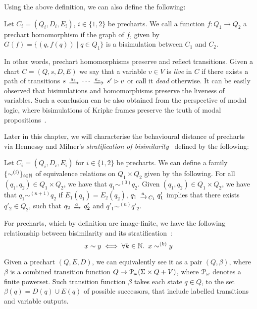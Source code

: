 Using the above definition, we can also define the following:
\begin{definition}
	 Let $C_i = (Q_i,D_i,E_i)$, $i \in \{1,2\}$ be precharts. We call a function $f \colon Q_1 \to Q_2$ a prechart homomorphism if the graph of $f$, given by $G(f) = \{(q,f(q)) \mid q \in Q_1\}$ is a bisimulation between $C_1$ and $C_2$.
\end{definition}
In other words, prechart homomorphisms preserve and reflect transitions. Given a chart $C=(Q,s,D,E)$ we say that a variable $v \in V$ is \emph{live} in $C$ if there exists a path of transitions $s \tr{a_1} \dots \tr{a_n} s' \rhd v$ or call it \emph{dead} otherwise. It can be easily observed that bisimulations and homomorphisms preserve the liveness of variables. Such a conclusion can be also obtained from the perspective of modal logic, where bisimulations of Kripke frames preserve the truth of modal propositions~\cite[Chapter~2]{Blackburn:2001:Modal}.

Later in this chapter, we will characterise the behavioural distance of precharts via Hennessy and Milner's \emph{stratification of bisimilarity}~\cite{hennessy:1985:algebraic} defined by the following:
	\begin{definition}
	Let $C_i = (Q_i, D_i, E_i)$ for $i \in \{1,2\}$ be precharts. We can define a family $\{\sim^{(i)} \}_{i \in \mathbb{N}}$ of equivalence relations on $Q_1 \times Q_2$ given by the following. For all $(q_1,q_2) \in Q_1 \times Q_2$, we have that $q_1 \sim^{(0)} q_2$. Given $(q_1, q_2) \in Q_1 \times Q_2$, we have that $q_1 \sim ^{(n+1)} q_2$ if  $E_1(q_1) = E_2(q_2)$,  $q_1 \tr{a}_{C_1} q'_1$ implies that there exists $q'_2 \in Q_2$, such that $q_2 \tr{a} q'_2$ and $q'_1 \sim^{(n)} q'_2$.
\end{definition}

For precharts, which by definition are image-finite, we have the following relationship between bisimilarity and its stratification~\cite{hennessy:1985:algebraic}:
\begin{equation}\label{eqn:stratification}
	x \sim y \iff \forall k \in \mathbb{N} \ldotp~x\sim^{(k)} y
\end{equation}

Given a prechart $(Q, E, D)$, we can equivalently see it as a pair $(Q, \beta)$, where $\beta$ is a combined transition function $Q \to \mathcal{P}_\omega (\Sigma \times Q + V)$, where $\mathcal{P}_\omega$ denotes a finite powerset. Such transition function $\beta$ takes each state $q \in Q$, to the set $\beta(q) = D(q) \cup E(q)$ of possible successors, that include labelled transitions and variable outputs.


